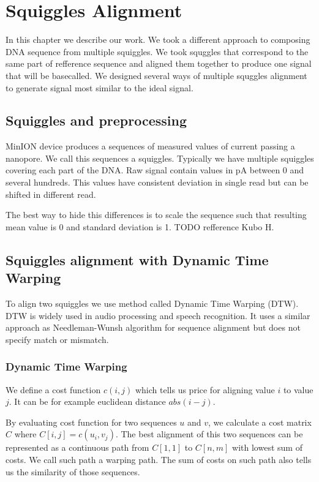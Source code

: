 \chapter{Squiggles Alignment}

\label{kap:squiggles} %

In this chapter we describe our work. We took a different approach to composing DNA sequence from multiple squiggles. 
We took squggles that correspond to the same part of refference sequence and aligned them together to produce one signal 
that will be basecalled. We designed several ways of multiple squggles alignment to generate signal most similar to the ideal signal.

\section{Squiggles and preprocessing}

MinION device produces a sequences of measured values of current passing a nanopore. We call this sequences a squiggles.
Typically we have multiple squiggles covering each part of the DNA. Raw signal contain values in pA between $0$ and several hundreds. 
This values have consistent deviation in single read but can be shifted in different read. 

The best way to hide this differences is to scale the sequence such that resulting mean value is 0 and standard deviation is 1.
TODO refference Kubo H.

\section{Squiggles alignment with Dynamic Time Warping}
To align two squiggles we use method called Dynamic Time Warping (DTW).
DTW is widely used in audio processing and speech recognition.
It uses a similar approach as Needleman-Wunsh algorithm for sequence alignment but does not specify match or mismatch.

\subsection{Dynamic Time Warping}

We define a cost function $c(i,j)$ which tells us price for aligning value $i$ to value $j$. 
It can be for example euclidean distance $abs(i-j)$.

By evaluating cost function for two sequences $u$ and $v$, we calculate a cost matrix $C$ where $C[i,j]=c(u_i,v_j)$.
The best alignment of this two sequences can be represented as a continuous path from $C[1,1]$ to $C[n,m]$ with lowest sum of costs. 
We call such path a warping path. The sum of costs on such path also tells us the similarity of those sequences.


